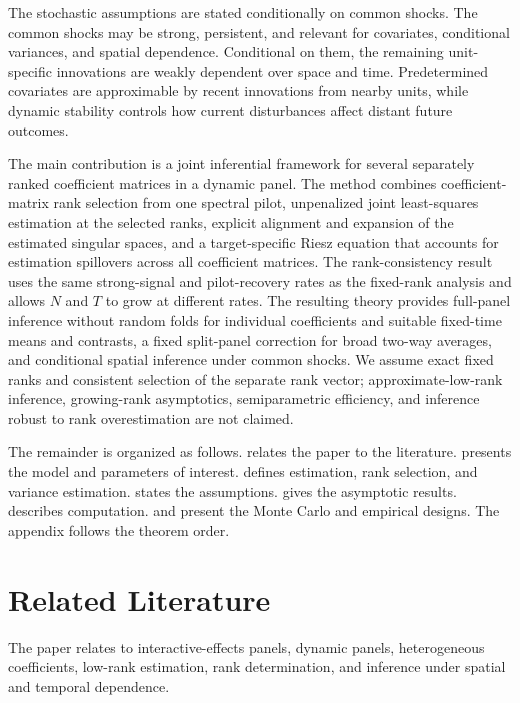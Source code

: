 \documentclass[11pt]{article}
\numberwithin{equation}{section}
\theoremstyle{remark}
\begin{document}
The stochastic assumptions are stated conditionally on common shocks. The common shocks may be strong, persistent, and relevant for covariates, conditional variances, and spatial dependence. Conditional on them, the remaining unit-specific innovations are weakly dependent over space and time. Predetermined covariates are approximable by recent innovations from nearby units, while dynamic stability controls how current disturbances affect distant future outcomes.

The main contribution is a joint inferential framework for several separately ranked coefficient matrices in a dynamic panel. The method combines coefficient-matrix rank selection from one spectral pilot, unpenalized joint least-squares estimation at the selected ranks, explicit alignment and expansion of the estimated singular spaces, and a target-specific Riesz equation that accounts for estimation spillovers across all coefficient matrices. The rank-consistency result uses the same strong-signal and pilot-recovery rates as the fixed-rank analysis and allows $N$ and $T$ to grow at different rates. The resulting theory provides full-panel inference without random folds for individual coefficients and suitable fixed-time means and contrasts, a fixed split-panel correction for broad two-way averages, and conditional spatial inference under common shocks. We assume exact fixed ranks and consistent selection of the separate rank vector; approximate-low-rank inference, growing-rank asymptotics, semiparametric efficiency, and inference robust to rank overestimation are not claimed.

The remainder is organized as follows.  relates the paper to the literature.  presents the model and parameters of interest.  defines estimation, rank selection, and variance estimation.  states the assumptions.  gives the asymptotic results.  describes computation.  and  present the Monte Carlo and empirical designs. The appendix follows the theorem order.

\section{Related Literature}
\label{sec:literature}

The paper relates to interactive-effects panels, dynamic panels, heterogeneous coefficients, low-rank estimation, rank determination, and inference under spatial and temporal dependence.
\end{document}
